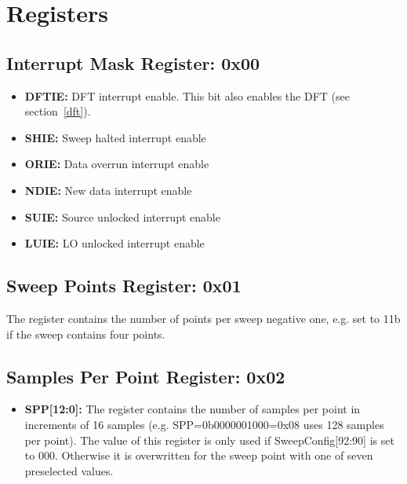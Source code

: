 \documentclass{article}
\newcommand{\bitrect}[2]{
  \begin{pgfonlayer}{foreground}
    \draw [thick] (0,0) rectangle (#1,1);
    \pgfmathsetmacro\result{#1-1}
    \foreach \x in {1,...,\result}
      \draw [thick] (\x,1) -- (\x, 0.8);
  \end{pgfonlayer}
  \bitlabels{#1}{#2}
}
\newcommand{\rwbits}[3]{
  \draw [thick] (#1,0) rectangle ++(#2,1) node[pos=0.5]{#3};
  \pgfmathsetmacro\start{#1+0.5}
  \pgfmathsetmacro\finish{#1+#2-0.5}
}
\newcommand{\robits}[3]{
  \begin{pgfonlayer}{background}
    \draw [thick, fill=lightgray] (#1,0) rectangle ++(#2,1) node[pos=0.5]{#3};
  \end{pgfonlayer}
  \pgfmathsetmacro\start{#1+0.5}
  \pgfmathsetmacro\finish{#1+#2-0.5}
}
\newcommand{\bitlabels}[2]{
  \foreach \bit in {1,...,#1}{
     \pgfmathsetmacro\result{#2}
     \node [above] at (\bit-0.5, 1) {\pgfmathprintnumber{\result}};
   }
}
\begin{document}
\section{Registers}
\subsection{Interrupt Mask Register: 0x00}
\begin{center}
\end{center}
\begin{itemize}
\item \textbf{DFTIE:} DFT interrupt enable. This bit also enables the DFT (see section~\ref{dft}).
\item \textbf{SHIE:} Sweep halted interrupt enable
\item \textbf{ORIE:} Data overrun interrupt enable 
\item \textbf{NDIE:} New data interrupt enable
\item \textbf{SUIE:} Source unlocked interrupt enable
\item \textbf{LUIE:} LO unlocked interrupt enable 
\end{itemize}

\subsection{Sweep Points Register: 0x01}
\begin{center}
\end{center}
The register contains the number of points per sweep negative one, e.g. set to 11b if the sweep contains four points.

\subsection{Samples Per Point Register: 0x02}
\label{reg:spp}
\begin{center}
\end{center}
\begin{itemize}
\item \textbf{SPP[12:0]:} The register contains the number of samples per point in increments of 16 samples (e.g. SPP=0b0000001000=0x08 uses 128 samples per point). The value of this register is only used if SweepConfig[92:90] is set to 000. Otherwise it is overwritten for the sweep point with one of seven preselected values.
\end{itemize}
\end{document}
